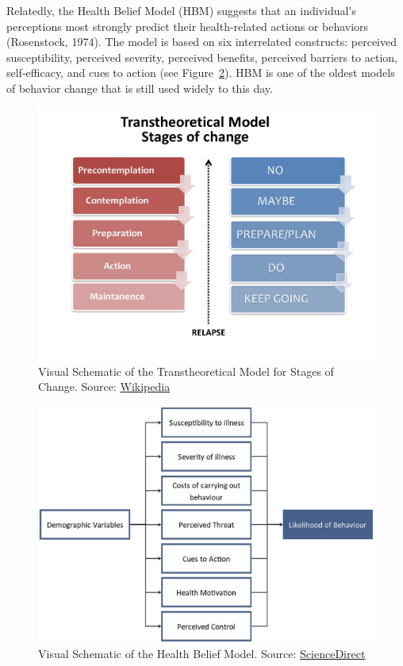 \documentclass[
  man]{apa6}
\begin{document}
Relatedly, the Health Belief Model (HBM) suggests that an individual's
perceptions most strongly predict their health-related actions or behaviors (Rosenstock, 1974).
The model is based on six interrelated constructs: perceived susceptibility,
perceived severity, perceived benefits, perceived barriers to action,
self-efficacy, and cues to action (see Figure~\ref{fig:hbm}). HBM is one of
the oldest models of behavior change that is still used widely to this day.



\begin{figure}
\centering
\includegraphics{ttm.jpg}
\caption{\label{fig:ttm}Visual Schematic of the Transtheoretical Model for Stages of Change. Source: \href{https://en.wikipedia.org/wiki/Transtheoretical_model}{Wikipedia}}
\end{figure}



\begin{figure}
\centering
\includegraphics{hbm.jpg}
\caption{\label{fig:hbm}Visual Schematic of the Health Belief Model. Source: \href{https://www.sciencedirect.com/topics/medicine-and-dentistry/health-belief-model}{ScienceDirect}}
\end{figure}
\end{document}
